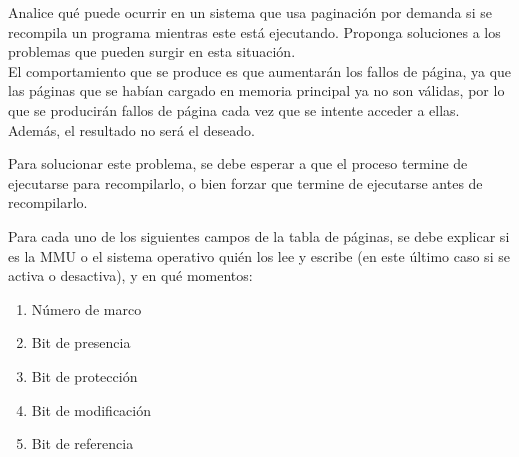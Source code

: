 \begin{ejercicio} %
    Analice qué puede ocurrir en un sistema que usa paginación por demanda si se recompila un programa mientras este está ejecutando.
    Proponga soluciones a los problemas que pueden surgir en esta situación.\\

    El comportamiento que se produce es que aumentarán los fallos de página, ya que las páginas que se habían cargado en memoria principal
    ya no son válidas, por lo que se producirán fallos de página cada vez que se intente acceder a ellas. Además, el resultado no será el deseado.

    Para solucionar este problema, se debe esperar a que el proceso termine de ejecutarse para recompilarlo, o bien forzar que termine de ejecutarse antes de recompilarlo.
\end{ejercicio}

\begin{ejercicio} %
Para cada uno de los siguientes campos de la tabla de páginas, se debe explicar si es la MMU o el sistema operativo quién los lee y escribe (en este último caso si se activa o desactiva), y en qué momentos:
\begin{enumerate}
    \item Número de marco
    \item Bit de presencia
    \item Bit de protección
    \item Bit de modificación
    \item Bit de referencia
\end{enumerate}
\end{ejercicio}

